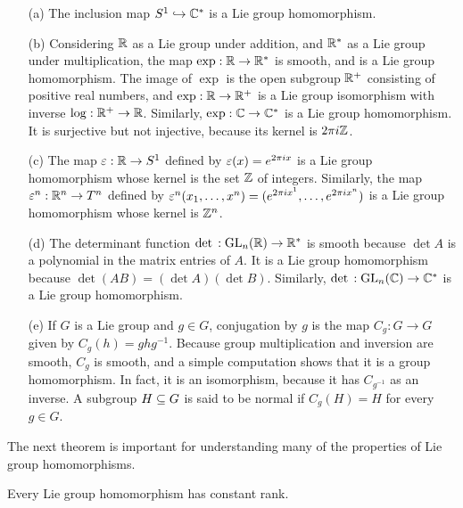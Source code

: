 \begin{example}
\mbox{}
\begin{itemize}
\item[(a)] The inclusion map $S^1\hookrightarrow\mathbb{C}^*$ is a Lie group homomorphism.
\item[(b)] Considering $\mathbb{R}$ as a Lie group under addition, and $\mathbb{R}^*$ as a Lie group under multiplication, the map $\exp:\mathbb{R}\to\mathbb{R}^*$ is smooth, and is a Lie group homomorphism. The image of $\exp$ is the open subgroup $\mathbb{R}^+$ consisting of positive real numbers, and $\exp:\mathbb{R}\to\mathbb{R}^+$ is a Lie group isomorphism with inverse $\log:\mathbb{R}^+\to\mathbb{R}$. Similarly, $\exp:\mathbb{C}\to\mathbb{C}^*$ is a Lie group homomorphism. It is surjective but not injective, because its kernel is $2\pi i\mathbb{Z}$.
\item[(c)] The map $\varepsilon:\mathbb{R}\to S^1$ defined by $\varepsilon(x)=e^{2\pi ix}$ is a Lie group homomorphism whose kernel is the set $\mathbb{Z}$ of integers. Similarly, the map $\varepsilon^n:\mathbb{R}^n\to T^n$ defined by $\varepsilon^n(x_1,\dots,x^n)=(e^{2\pi ix^1},\dots,e^{2\pi ix^n})$ is a Lie group homomorphism whose kernel is $\mathbb{Z}^n$.
\item[(d)] The determinant function $\mathrm{det}\,:\mathrm{GL}_n(\mathbb{R})\to\mathbb{R}^*$ is smooth because $\det A$ is a polynomial in the matrix entries of $A$. It is a Lie group homomorphism
because $\det(AB)=(\det A)(\det B)$. Similarly, $\mathrm{det}\,:\mathrm{GL}_n(\mathbb{C})\to\mathbb{C}^*$ is a Lie group homomorphism.
\item[(e)] If $G$ is a Lie group and $g\in G$, conjugation by $g$ is the map $C_g:G\to G$ given by $C_g(h)=ghg^{-1}$. Because group multiplication and inversion are smooth, $C_g$ is smooth, and a simple computation shows that it is a group homomorphism. In fact, it is an isomorphism, because it has $C_{g^{-1}}$ as an inverse. A subgroup $H\subseteq G$ is said to be normal if $C_g(H)=H$ for every $g\in G$.
\end{itemize}
\end{example}
The next theorem is important for understanding many of the properties of Lie group homomorphisms.
\begin{theorem}\label{Lie homo constant rank}
Every Lie group homomorphism has constant rank.
\end{theorem}
